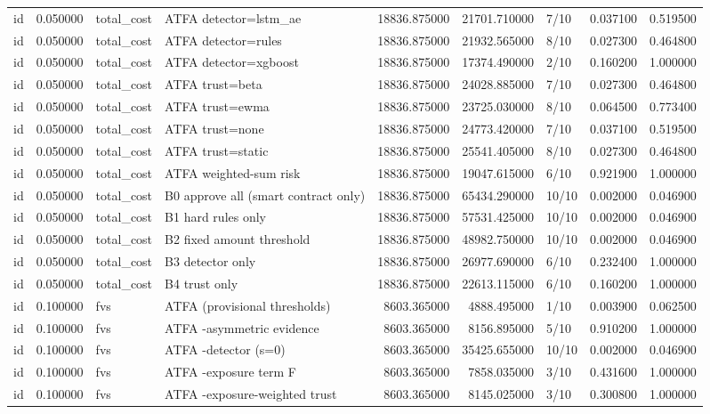 \begin{tabular}{lrllrrlrr}
id & 0.050000 & total\_cost & ATFA detector=lstm\_ae & 18836.875000 & 21701.710000 & 7/10 & 0.037100 & 0.519500 \\
id & 0.050000 & total\_cost & ATFA detector=rules & 18836.875000 & 21932.565000 & 8/10 & 0.027300 & 0.464800 \\
id & 0.050000 & total\_cost & ATFA detector=xgboost & 18836.875000 & 17374.490000 & 2/10 & 0.160200 & 1.000000 \\
id & 0.050000 & total\_cost & ATFA trust=beta & 18836.875000 & 24028.885000 & 7/10 & 0.027300 & 0.464800 \\
id & 0.050000 & total\_cost & ATFA trust=ewma & 18836.875000 & 23725.030000 & 8/10 & 0.064500 & 0.773400 \\
id & 0.050000 & total\_cost & ATFA trust=none & 18836.875000 & 24773.420000 & 7/10 & 0.037100 & 0.519500 \\
id & 0.050000 & total\_cost & ATFA trust=static & 18836.875000 & 25541.405000 & 8/10 & 0.027300 & 0.464800 \\
id & 0.050000 & total\_cost & ATFA weighted-sum risk & 18836.875000 & 19047.615000 & 6/10 & 0.921900 & 1.000000 \\
id & 0.050000 & total\_cost & B0 approve all (smart contract only) & 18836.875000 & 65434.290000 & 10/10 & 0.002000 & 0.046900 \\
id & 0.050000 & total\_cost & B1 hard rules only & 18836.875000 & 57531.425000 & 10/10 & 0.002000 & 0.046900 \\
id & 0.050000 & total\_cost & B2 fixed amount threshold & 18836.875000 & 48982.750000 & 10/10 & 0.002000 & 0.046900 \\
id & 0.050000 & total\_cost & B3 detector only & 18836.875000 & 26977.690000 & 6/10 & 0.232400 & 1.000000 \\
id & 0.050000 & total\_cost & B4 trust only & 18836.875000 & 22613.115000 & 6/10 & 0.160200 & 1.000000 \\
id & 0.100000 & fvs & ATFA (provisional thresholds) & 8603.365000 & 4888.495000 & 1/10 & 0.003900 & 0.062500 \\
id & 0.100000 & fvs & ATFA -asymmetric evidence & 8603.365000 & 8156.895000 & 5/10 & 0.910200 & 1.000000 \\
id & 0.100000 & fvs & ATFA -detector (s=0) & 8603.365000 & 35425.655000 & 10/10 & 0.002000 & 0.046900 \\
id & 0.100000 & fvs & ATFA -exposure term F & 8603.365000 & 7858.035000 & 3/10 & 0.431600 & 1.000000 \\
id & 0.100000 & fvs & ATFA -exposure-weighted trust & 8603.365000 & 8145.025000 & 3/10 & 0.300800 & 1.000000 \\

\end{tabular}
